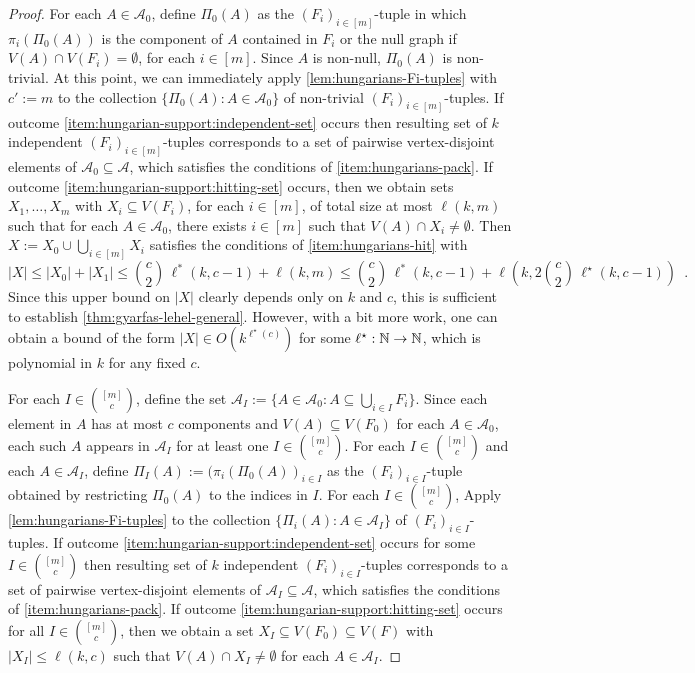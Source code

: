 \documentclass{patmorin}
\begin{document}
\begin{proof}

  For each $A\in\mathcal{A}_0$, define $\Pi_0(A)$ as the $(F_i)_{i\in[m]}$-tuple in which $\pi_i(\Pi_0(A))$ is the component of $A$ contained in $F_i$ or the null graph if $V(A)\cap V(F_i)=\emptyset$, for each $i\in[m]$.  Since $A$ is non-null, $\Pi_0(A)$ is non-trivial.
  At this point, we can immediately apply \cref{lem:hungarians-Fi-tuples} with $c':=m$ to the collection $\{\Pi_0(A):A\in \mathcal{A}_0\}$ of non-trivial $(F_i)_{i\in[m]}$-tuples.  If outcome \cref{item:hungarian-support:independent-set} occurs then resulting set of $k$ independent $(F_i)_{i\in[m]}$-tuples corresponds to a set of pairwise vertex-disjoint elements of $\mathcal{A}_0\subseteq \mathcal{A}$, which satisfies the conditions of \cref{item:hungarians-pack}.  If outcome \cref{item:hungarian-support:hitting-set} occurs, then we obtain sets $X_1,\ldots,X_m$ with $X_i\subseteq V(F_i)$, for each $i\in[m]$, of total size at most $\ell(k,m)$ such that for each $A\in\mathcal{A}_0$, there exists $i\in[m]$ such that $V(A)\cap X_i\neq\emptyset$.  Then $X:=X_0\cup \bigcup_{i\in[m]}X_i$ satisfies the conditions of \cref{item:hungarians-hit} with
  \[
     \textstyle |X|\le |X_0|+|X_1|\le \binom{c}{2}\,\ell^*(k,c-1) + \ell(k,m)
     \le \binom{c}{2}\,\ell^*(k,c-1) + \ell(k,2\binom{c}{2}\,\ell^\star(k,c-1)) \enspace .
  \]
  Since this upper bound on $|X|$ clearly depends only on $k$ and $c$, this is sufficient to establish \cref{thm:gyarfas-lehel-general}.  However, with a bit more work, one can obtain a bound of the form $|X|\in O(k^{\ell^\star(c)})$ for some $\ell^\star:\mathbb{N}\to\mathbb{N}$, which is polynomial in $k$ for any fixed $c$.

  For each $I\in\binom{[m]}{c}$, define the set $\mathcal{A}_I:=\{A\in\mathcal{A}_0:A\subseteq \bigcup_{i\in I}F_i\}$.  Since each element in $A$ has at most $c$ components and $V(A)\subseteq V(F_0)$ for each $A\in \mathcal{A}_0$, each such $A$ appears in $\mathcal{A}_I$ for at least one $I\in\binom{[m]}{c}$.  For each $I\in\binom{[m]}{c}$ and each $A\in\mathcal{A}_I$, define $\Pi_I(A):=(\pi_i(\Pi_0(A))_{i\in I}$ as the $(F_i)_{i\in I}$-tuple obtained by restricting $\Pi_0(A)$ to the indices in $I$.  For each $I\in\binom{[m]}{c}$,  Apply \cref{lem:hungarians-Fi-tuples} to the collection $\{\Pi_i(A):A\in \mathcal{A}_I\}$ of $(F_i)_{i\in I}$-tuples.  If outcome \cref{item:hungarian-support:independent-set} occurs for some $I\in\binom{[m]}{c}$ then resulting set of $k$ independent $(F_i)_{i\in I}$-tuples corresponds to a set of pairwise vertex-disjoint elements of $\mathcal{A}_I\subseteq \mathcal{A}$, which satisfies the conditions of \cref{item:hungarians-pack}.  If outcome \cref{item:hungarian-support:hitting-set} occurs for all $I\in\binom{[m]}{c}$, then we obtain a set $X_I\subseteq V(F_0)\subseteq V(F)$ with $|X_I|\le \ell(k,c)$ such that $V(A)\cap X_I\neq\emptyset$ for each $A\in\mathcal{A}_I$.


\end{proof}
\end{document}
